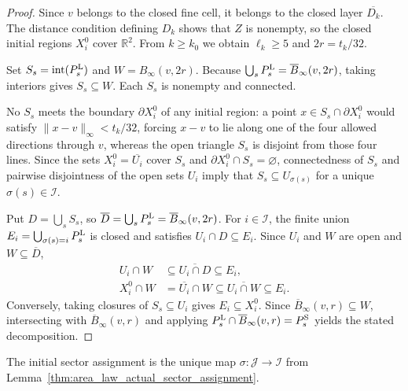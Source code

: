 \begin{proof}\leanok
    Since $v$ belongs to the closed fine cell, it belongs to the closed layer
    $\overline{D_k}$. The distance condition defining $D_k$ shows that $Z$ is
    nonempty, so the closed initial regions $X_i^0$ cover $\mathbb R^2$. From
    $k\ge k_0$ we obtain $\ell_k\ge5$ and $2r=t_k/32$.

    Set $S_s=\operatorname{int}(P_s^{\rm L})$ and $W=B_\infty(v,2r)$. Because
    $\bigcup_sP_s^{\rm L}=\overline B_\infty(v,2r)$, taking interiors gives
    $S_s\subseteq W$. Each $S_s$ is nonempty and connected.

    No $S_s$ meets the boundary $\partial X_i^0$ of any initial region: a point
    $x\in S_s\cap\partial X_i^0$ would satisfy $\|x-v\|_\infty<t_k/32$, forcing
    $x-v$ to lie along one of the four allowed directions through $v$, whereas
    the open triangle $S_s$ is disjoint from those four lines. Since the sets
    $X_i^0=\overline{U_i}$ cover $S_s$ and $\partial X_i^0\cap S_s=\varnothing$,
    connectedness of $S_s$ and pairwise disjointness of the open sets $U_i$
    imply that $S_s\subseteq U_{\sigma(s)}$ for a unique $\sigma(s)\in\mathcal I$.

    Put $D=\bigcup_sS_s$, so $\overline D=\bigcup_sP_s^{\rm L}=\overline B_\infty(v,2r)$.
    For $i\in\mathcal I$, the finite union $E_i=\bigcup_{\sigma(s)=i}P_s^{\rm L}$
    is closed and satisfies $U_i\cap D\subseteq E_i$. Since $U_i$ and $W$ are
    open and $W\subseteq\overline D$,
    \begin{align}
        U_i\cap W   & \subseteq\overline{U_i\cap D}\subseteq E_i, \\
        X_i^0\cap W & =\overline{U_i}\cap W
        \subseteq\overline{U_i\cap W}\subseteq E_i.
    \end{align}
    Conversely, taking closures of $S_s\subseteq U_i$ gives $E_i\subseteq X_i^0$.
    Since $\overline B_\infty(v,r)\subseteq W$, intersecting with
    $\overline B_\infty(v,r)$ and applying
    $P_s^{\rm L}\cap\overline B_\infty(v,r)=P_s^{\rm S}$ yields the stated
    decomposition.
\end{proof}

\begin{definition}
    \label{def:area_law_initial_sector_assignment}
    \leanok
    The initial sector assignment is the unique map
    $\sigma:\mathcal J\to\mathcal I$ from
    Lemma~\ref{thm:area_law_actual_sector_assignment}.
\end{definition}
